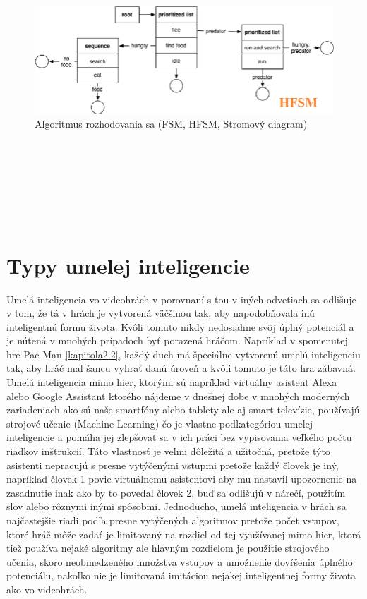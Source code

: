 \documentclass[10pt,oneside,slovak,a4paper]{article}
\begin{document}
\begin{figure}[tbh]
	\includegraphics[scale=0.4]{hfsm.png}
	\caption{Algoritmus rozhodovania sa (FSM, HFSM, Stromový diagram)}
	\label{obr6}
\end{figure}
\\\\
\\\\
\\\\
\section{Typy umelej inteligencie} \label{kapitola4}
Umelá inteligencia vo videohrách v porovnaní s tou v iných odvetiach sa odlišuje v tom, že tá v hrách je vytvorená väčšinou tak, aby napodobňovala inú inteligentnú formu života. Kvôli tomuto nikdy nedosiahne svôj úplný potenciál a je nútená v mnohých prípadoch byť porazená hráčom. Napríklad v spomenutej hre Pac-Man \ref{kapitola2.2}, každý duch má špeciálne vytvorenú umelú inteligenciu tak, aby hráč mal šancu vyhrať danú úroveň a kvôli tomuto je táto hra zábavná. Umelá inteligencia mimo hier, ktorými sú napríklad virtuálny asistent Alexa alebo Google Assistant ktorého nájdeme v dnešnej dobe v mnohých moderných zariadeniach ako sú naše smartfóny alebo tablety ale aj smart televízie, používajú strojové učenie (Machine Learning) čo je vlastne podkategóriou umelej inteligencie a pomáha jej zlepšovať sa v ich práci bez vypisovania veľkého počtu riadkov inštrukcií. Táto vlastnosť je veľmi dôležitá a užitočná, pretože týto asistenti nepracujú s presne vytýčenými vstupmi pretože každý človek je iný, napríklad človek 1 povie virtuálnemu asistentovi aby mu nastavil upozornenie na zasadnutie inak ako by to povedal človek 2, buď sa odlišujú v nárečí, použitím slov alebo rôznymi inými spôsobmi. Jednoducho, umelá inteligencia v hrách sa najčastejšie riadi podľa presne vytýčených algoritmov pretože počet vstupov, ktoré hráč môže zadať je limitovaný na rozdiel od tej využívanej mimo hier, ktorá tiež používa nejaké algoritmy ale hlavným rozdielom je použitie strojového učenia, skoro neobmedzeného množstva vstupov a umožnenie dovŕšenia úplného potenciálu, nakoľko nie je limitovaná imitáciou nejakej inteligentnej formy života ako vo videohrách.
\end{document}
